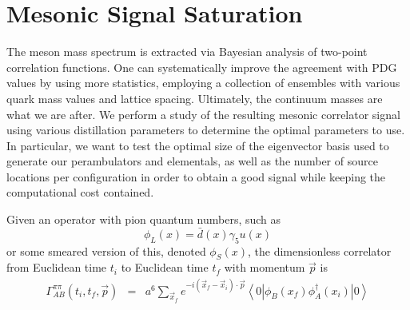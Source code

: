 
\chapter{Mesonic Signal Saturation}
\label{sec:signal}
The meson mass spectrum is extracted via Bayesian analysis of two-point correlation functions. One can systematically improve the agreement with PDG values by using more statistics, employing a collection of ensembles with various quark mass values and lattice spacing. Ultimately, the continuum masses are what we are after.
We perform a study of the resulting mesonic correlator signal using various distillation parameters to determine the optimal parameters to use. In particular, we want to test the optimal size of the eigenvector basis used to generate our perambulators and elementals, as well as the number of source locations per configuration in order to obtain a good signal while keeping the computational cost contained. 



Given an operator with pion quantum numbers, such as
\[
\phi_L(x) = \bar{d}(x)\gamma_5u(x)
\]
or some smeared version of this, denoted $\phi_S(x)$,
the dimensionless correlator from Euclidean time $t_i$ to Euclidean time $t_f$
with momentum $\vec p$ is
\begin{eqnarray}
\Gamma^{\pi\pi}_{AB}(t_i,t_f,\vec{p})
 &=& a^6\sum_{{\vec x}_f}e^{-i(\vec{x}_f-\vec{x}_i)\cdot\vec{p}}
     \left<0\left|\phi_B(x_f)\phi_A^\dagger(x_i)\right|0\right> \nonumber \\
\end{eqnarray}



